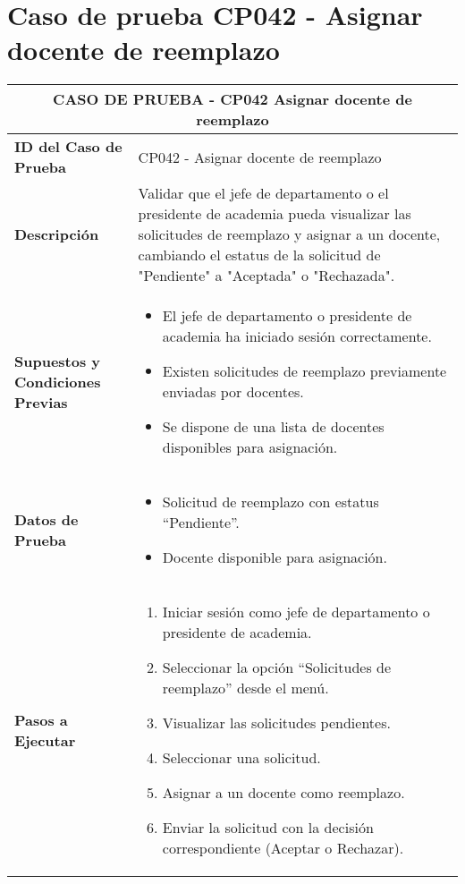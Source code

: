 \section{Caso de prueba CP042 - Asignar docente de reemplazo}

\begin{longtable}{|p{5cm}|p{10cm}|}
	\hline
	\multicolumn{2}{|c|}{\textbf{CASO DE PRUEBA - CP042 Asignar docente de reemplazo}} \\
	\hline
	\textbf{ID del Caso de Prueba} & CP042 - Asignar docente de reemplazo \\
	\hline
	\textbf{Descripción} & Validar que el jefe de departamento o el presidente de academia pueda visualizar las solicitudes de reemplazo y asignar a un docente, cambiando el estatus de la solicitud de "Pendiente" a "Aceptada" o "Rechazada". \\
	\hline
	\textbf{Supuestos y Condiciones Previas} & 
	\begin{itemize}
		\item El jefe de departamento o presidente de academia ha iniciado sesión correctamente.
		\item Existen solicitudes de reemplazo previamente enviadas por docentes.
		\item Se dispone de una lista de docentes disponibles para asignación.
	\end{itemize} \\
	\hline
	\textbf{Datos de Prueba} & 
	\begin{itemize}
		\item Solicitud de reemplazo con estatus “Pendiente”.
		\item Docente disponible para asignación.
	\end{itemize} \\
	\hline
	\textbf{Pasos a Ejecutar} & 
	\begin{enumerate}
		\item Iniciar sesión como jefe de departamento o presidente de academia.
		\item Seleccionar la opción “Solicitudes de reemplazo” desde el menú.
		\item Visualizar las solicitudes pendientes.
		\item Seleccionar una solicitud.
		\item Asignar a un docente como reemplazo.
		\item Enviar la solicitud con la decisión correspondiente (Aceptar o Rechazar).
	\end{enumerate} \\

\end{longtable}
